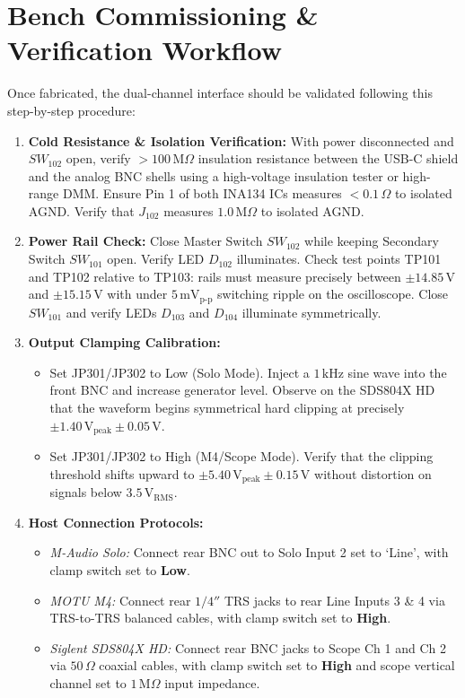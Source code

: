 \documentclass[11pt, letterpaper]{article}
\begin{document}
\clearpage

\section{Bench Commissioning \& Verification Workflow}

Once fabricated, the dual-channel interface should be validated following this step-by-step procedure:
\begin{enumerate}[label=\textbf{\arabic*.}]
    \item \textbf{Cold Resistance \& Isolation Verification:} With power disconnected and $SW_{102}$ open, verify $>100\,\text{M}\Omega$ insulation resistance between the USB-C shield and the analog BNC shells using a high-voltage insulation tester or high-range DMM. Ensure Pin 1 of both INA134 ICs measures $< 0.1\,\Omega$ to isolated AGND. Verify that $J_{102}$ measures $1.0\,\text{M}\Omega$ to isolated AGND.
    \item \textbf{Power Rail Check:} Close Master Switch $SW_{102}$ while keeping Secondary Switch $SW_{101}$ open. Verify LED $D_{102}$ illuminates. Check test points TP101 and TP102 relative to TP103: rails must measure precisely between $\pm 14.85\,\text{V}$ and $\pm 15.15\,\text{V}$ with under $5\,\text{mV}_{\text{p-p}}$ switching ripple on the oscilloscope. Close $SW_{101}$ and verify LEDs $D_{103}$ and $D_{104}$ illuminate symmetrically.
    \item \textbf{Output Clamping Calibration:} 
    \begin{itemize}
        \item Set JP301/JP302 to Low (Solo Mode). Inject a $1\,\text{kHz}$ sine wave into the front BNC and increase generator level. Observe on the SDS804X HD that the waveform begins symmetrical hard clipping at precisely $\pm 1.40\,\text{V}_{\text{peak}} \pm 0.05\,\text{V}$.
        \item Set JP301/JP302 to High (M4/Scope Mode). Verify that the clipping threshold shifts upward to $\pm 5.40\,\text{V}_{\text{peak}} \pm 0.15\,\text{V}$ without distortion on signals below $3.5\,\text{V}_{\text{RMS}}$.
    \end{itemize}
    \item \textbf{Host Connection Protocols:}
    \begin{itemize}
        \item \textit{M-Audio Solo:} Connect rear BNC out to Solo Input 2 set to `Line', with clamp switch set to \textbf{Low}.
        \item \textit{MOTU M4:} Connect rear $1/4''$ TRS jacks to rear Line Inputs 3 \& 4 via TRS-to-TRS balanced cables, with clamp switch set to \textbf{High}.
        \item \textit{Siglent SDS804X HD:} Connect rear BNC jacks to Scope Ch 1 and Ch 2 via $50\,\Omega$ coaxial cables, with clamp switch set to \textbf{High} and scope vertical channel set to $1\,\text{M}\Omega$ input impedance.
    \end{itemize}
\end{enumerate}
\end{document}
